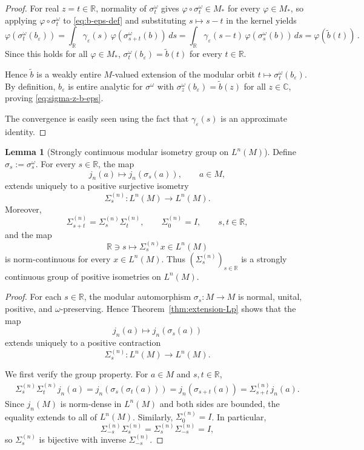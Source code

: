\documentclass[11pt,a4paper]{article}
\theoremstyle{plain}
\numberwithin{theorem}{section}
\theoremstyle{definition}
\newtheorem{lemma}[theorem]{Lemma}
\newcommand{\?}{\overset{?}{=}}
\newcommand{\ve}{\varepsilon}
\newcommand{\g}{\gamma}
\newcommand{\s}{\sigma}
\newcommand{\w}{\omega}
\begin{document}
\begin{appendix}
\begin{proof}
For real $z=t\in\mathbb R$, normality of $\s^\w_t$ gives $\varphi\circ\s^\w_t\in M_*$ for every $\varphi\in M_*$, so applying $\varphi\circ\s^\w_t$ to \eqref{eq:b-eps-def} and substituting $s\mapsto s-t$ in the kernel yields
\begin{equation}
  \varphi(\s^\w_t(b_\ve))=\int_{\mathbb R}\g_\ve(s)\,\varphi(\s^\w_{s+t}(b))\,ds=\int_{\mathbb R}\g_\ve(s-t)\,\varphi(\s^\w_s(b))\,ds=\varphi(\widetilde b(t))\,.
\end{equation}
Since this holds for all $\varphi\in M_*$, $\s^\w_t(b_\ve)=\widetilde b(t)$ for every $t\in\mathbb R$.

Hence $\widetilde b$ is a weakly entire $M$-valued extension of the modular orbit $t\mapsto\s^\w_t(b_\ve)$.  By definition, $b_\ve$ is entire analytic for $\s^\w$ with $\s^\w_z(b_\ve)=\widetilde b(z)$ for all $z\in\mathbb C$, proving \eqref{eq:sigma-z-b-eps}.

The convergence is easily seen using the fact that $\g_\ve(s)$ is an approximate identity.
\end{proof}

\begin{lemma}[Strongly continuous modular isometry group on \(L^n(M)\)]
\label{lem:modular-Ln-group}
Define $\sigma_s:= \sigma_s^\omega$.
For every \(s\in\mathbb R\), the map
\[
        j_n(a)\longmapsto j_n(\sigma_s(a)),
        \qquad a\in M,
\]
extends uniquely to a positive surjective isometry
\[
        \Sigma_s^{(n)}:L^n(M)\longrightarrow L^n(M).
\]
Moreover,
\begin{equation}
\label{eq:Sigma-group-property}
        \Sigma_{s+t}^{(n)}
        =
        \Sigma_s^{(n)}\Sigma_t^{(n)},
        \qquad
        \Sigma_0^{(n)}=I,
        \qquad s,t\in\mathbb R,
\end{equation}
and the map
\[
        \mathbb R\ni s\longmapsto \Sigma_s^{(n)}x\in L^n(M)
\]
is norm-continuous for every \(x\in L^n(M)\).  Thus
\((\Sigma_s^{(n)})_{s\in\mathbb R}\) is a strongly continuous group of
positive isometries on \(L^n(M)\).
\end{lemma}

\begin{proof}
For each \(s\in\mathbb R\), the modular automorphism
\(\sigma_s:M\to M\) is normal, unital, positive, and
\(\omega\)-preserving.  Hence Theorem~\ref{thm:extension-Lp} shows that the
map
\[
        j_n(a)\longmapsto j_n(\sigma_s(a))
\]
extends uniquely to a positive contraction
\[
        \Sigma_s^{(n)}:L^n(M)\longrightarrow L^n(M).
\]

We first verify the group property.  For \(a\in M\) and \(s,t\in\mathbb R\),
\[
\begin{aligned}
        \Sigma_s^{(n)}\Sigma_t^{(n)}j_n(a)=
        j_n(\sigma_s(\sigma_t(a)))  =
        j_n(\sigma_{s+t}(a)) =
        \Sigma_{s+t}^{(n)}j_n(a).
\end{aligned}
\]
Since \(j_n(M)\) is norm-dense in \(L^n(M)\) and both sides are bounded,
the equality extends to all of \(L^n(M)\).  Similarly,
\(\Sigma_0^{(n)}=I\).  In particular,
\[
        \Sigma_{-s}^{(n)}\Sigma_s^{(n)}
        =
        \Sigma_s^{(n)}\Sigma_{-s}^{(n)}
        =
        I,
\]
so \(\Sigma_s^{(n)}\) is bijective with inverse
\(\Sigma_{-s}^{(n)}\).


\end{proof}
\end{appendix}
\end{document}
